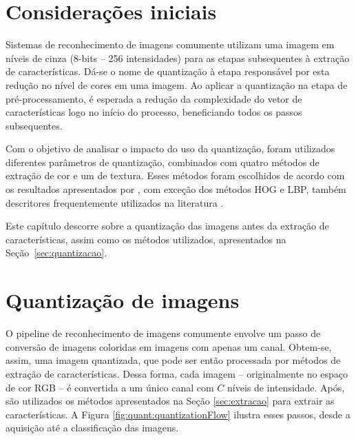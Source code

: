 \section{Considerações iniciais}

Sistemas de reconhecimento de imagens comumente utilizam uma imagem em níveis de cinza (8-bits -- 256 intensidades) para as etapas subsequentes à extração de características. Dá-se o nome de quantização à etapa responsável por esta redução no nível de cores em uma imagem. Ao aplicar a quantização na etapa de pré-processamento, é esperada a redução da complexidade do vetor de características logo no início do processo, beneficiando todos os passos subsequentes.

Com o objetivo de analisar o impacto do uso da quantização, foram utilizados diferentes parâmetros de quantização, combinados com quatro métodos de extração de cor e um de textura. Esses métodos foram escolhidos de acordo com os resultados apresentados por , com exceção dos métodos HOG e LBP, também descritores frequentemente utilizados na literatura \cite{Wang2009a}.

Este capítulo descorre sobre a quantização das imagens antes da extração de características, assim como os métodos utilizados, apresentados na Seção~\ref{sec:quantizacao}.

\section{Quantização de imagens}

O pipeline de reconhecimento de imagens comumente envolve um passo de conversão de imagens coloridas em imagens com apenas um canal. Obtem-se, assim, uma imagem quantizada, que pode ser então processada por métodos de extração de características. Dessa forma, cada imagem -- originalmente no espaço de cor RGB -- é convertida a um único canal com $C$ níveis de intensidade. Após, são utilizados os métodos apresentados na Seção \ref{sec:extracao} para extrair as características.
A Figura \ref{fig:quant:quantizationFlow} ilustra esses passos, desde a aquisição até a classificação das imagens.

